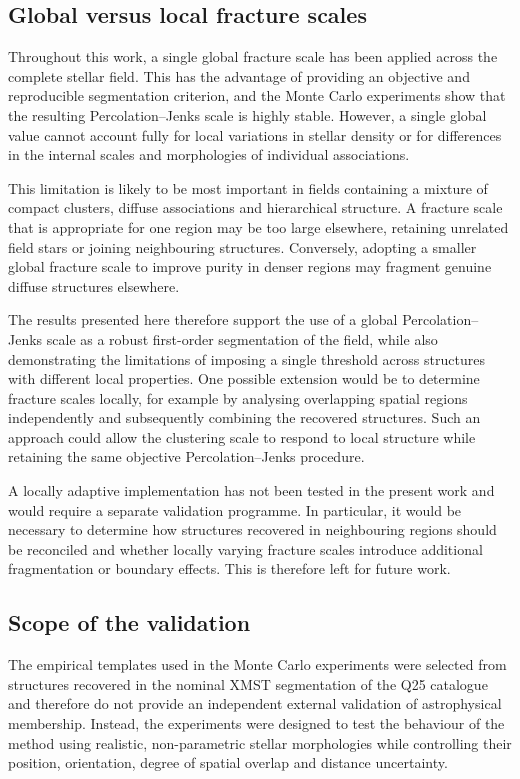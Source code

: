 \documentclass[fleqn,usenatbib]{mnras}
\begin{document}
\subsection{Global versus local fracture scales}
Throughout this work, a single global fracture scale has been applied across the complete stellar field. This has the advantage of providing an objective and reproducible segmentation criterion, and the Monte Carlo experiments show that the resulting Percolation–Jenks scale is highly stable. However, a single global value cannot account fully for local variations in stellar density or for differences in the internal scales and morphologies of individual associations.

This limitation is likely to be most important in fields containing a mixture of compact clusters, diffuse associations and hierarchical structure. A fracture scale that is appropriate for one region may be too large elsewhere, retaining unrelated field stars or joining neighbouring structures. Conversely, adopting a smaller global fracture scale to improve purity in denser regions may fragment genuine diffuse structures elsewhere.

The results presented here therefore support the use of a global Percolation–Jenks scale as a robust first-order segmentation of the field, while also demonstrating the limitations of imposing a single threshold across structures with different local properties. One possible extension would be to determine fracture scales locally, for example by analysing overlapping spatial regions independently and subsequently combining the recovered structures. Such an approach could allow the clustering scale to respond to local structure while retaining the same objective Percolation–Jenks procedure.

A locally adaptive implementation has not been tested in the present work and would require a separate validation programme. In particular, it would be necessary to determine how structures recovered in neighbouring regions should be reconciled and whether locally varying fracture scales introduce additional fragmentation or boundary effects. This is therefore left for future work.


\subsection{Scope of the validation}

The empirical templates used in the Monte Carlo experiments were selected from structures recovered in the nominal XMST segmentation of the Q25 catalogue and therefore do not provide an independent external validation of astrophysical membership. Instead, the experiments were designed to test the behaviour of the method using realistic, non-parametric stellar morphologies while controlling their position, orientation, degree of spatial overlap and distance uncertainty.
\end{document}
